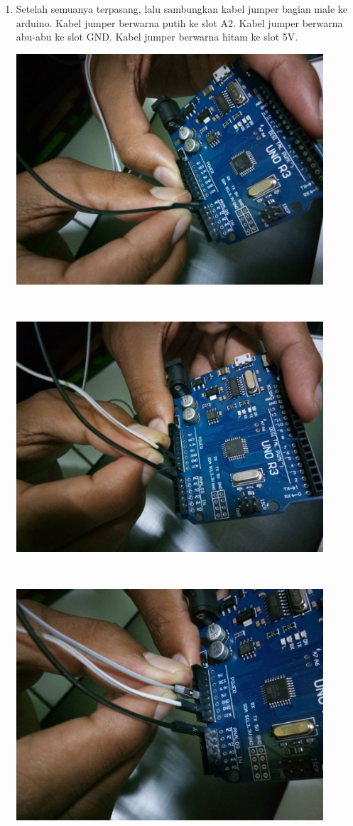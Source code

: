 \begin{enumerate}
\item Setelah semuanya terpasang, lalu sambungkan kabel jumper bagian male ke arduino. Kabel jumper berwarna putih ke slot A2. Kabel jumper berwarna abu-abu ke slot GND. Kabel jumper berwarna hitam ke slot 5V.
\break\\
\centerline{\includegraphics[width=0.9\textwidth]{figures/ss1.jpeg}}
\break\\
\centerline{\includegraphics[width=0.9\textwidth]{figures/ss2.jpeg}}
\break\\
\centerline{\includegraphics[width=0.9\textwidth]{figures/ss3.jpeg}}

\end{enumerate}
